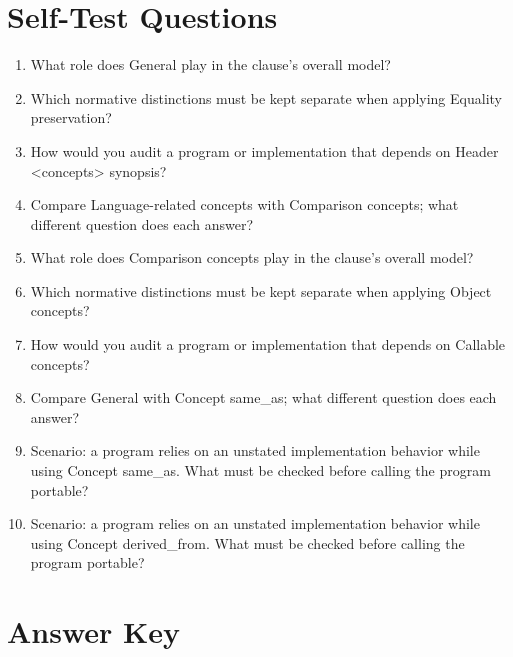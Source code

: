 \documentclass[11pt,letterpaper]{article}
\begin{document}
\section{Self-Test Questions}
\begin{enumerate}
\item What role does General play in the clause's overall model?
\item Which normative distinctions must be kept separate when applying Equality preservation?
\item How would you audit a program or implementation that depends on Header <concepts> synopsis?
\item Compare Language-related concepts with Comparison concepts; what different question does each answer?
\item What role does Comparison concepts play in the clause's overall model?
\item Which normative distinctions must be kept separate when applying Object concepts?
\item How would you audit a program or implementation that depends on Callable concepts?
\item Compare General with Concept same\_\allowbreak{}as; what different question does each answer?
\item Scenario: a program relies on an unstated implementation behavior while using Concept same\_\allowbreak{}as. What must be checked before calling the program portable?
\item Scenario: a program relies on an unstated implementation behavior while using Concept derived\_\allowbreak{}from. What must be checked before calling the program portable?
\end{enumerate}
\clearpage\section{Answer Key}
\end{document}
